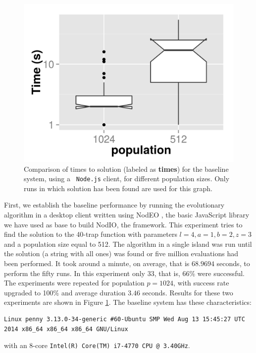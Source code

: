 \documentclass[journal,onecolumn]{IEEEtran}
\begin{document}
\begin{figure}[!t]
\centering
\includegraphics[width=12cm]{baseline-times.png}
\caption{Comparison of times to solution (labeled as {\bf times}) for the baseline system, using a {\tt
    Node.js} client, for different population sizes. Only
runs in which solution has been found are used for this graph.}
\label{fig:baseline}
\end{figure}
First, we establish the baseline performance by running the
evolutionary algorithm in a desktop client written using NodEO
\cite{nodeo2014}, the basic JavaScript library we have used as base to
build {\sf NodIO}, the framework. This experiment tries to 
find the solution to the 40-trap function with parameters $l=4, a=1,
b=2, z=3$ and a population size equal to 512. The algorithm in a
single island was run until the solution (a string with all
ones) was found or five million evaluations had been performed. It
took around a minute, on average, that is $68.9694$ seconds, to
perform the fifty runs. In this experiment only 33, that is, 66\% were
successful. The experiments were repeated for population $p=1024$,
with success rate upgraded to 100\% and average duration $3.46$
seconds. Results for these two experiments
are shown in Figure \ref{fig:baseline}. The baseline system has these
characteristics: \begin{verbatim}
Linux penny 3.13.0-34-generic #60-Ubuntu SMP Wed Aug 13 15:45:27 UTC
2014 x86_64 x86_64 x86_64 GNU/Linux
\end{verbatim}
with an 8-core {\tt Intel(R) Core(TM) i7-4770 CPU @ 3.40GHz}.
\end{document}
